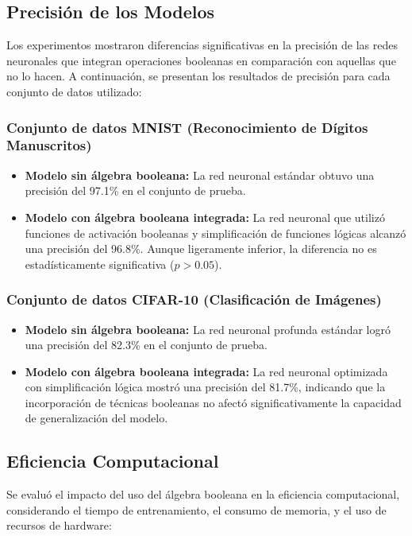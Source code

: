 \documentclass{article}
\begin{document}
\begin{multicols}{2}
\subsection{Precisión de los Modelos}
Los experimentos mostraron diferencias significativas en la precisión de las redes neuronales 
que integran operaciones booleanas en comparación con aquellas que no lo hacen. A continuación, 
se presentan los resultados de precisión para cada conjunto de datos utilizado:

\subsubsection{Conjunto de datos MNIST (Reconocimiento de Dígitos Manuscritos)}
\begin{itemize}
    \item \textbf{Modelo sin álgebra booleana:} La red neuronal estándar obtuvo una precisión 
    del 97.1\% en el conjunto de prueba.
    \item \textbf{Modelo con álgebra booleana integrada:} La red neuronal que utilizó 
    funciones de activación booleanas y simplificación de funciones lógicas alcanzó 
    una precisión del 96.8\%. Aunque ligeramente inferior, la diferencia no es 
    estadísticamente significativa ($p > 0.05$).
\end{itemize}

\subsubsection{Conjunto de datos CIFAR-10 (Clasificación de Imágenes)}
\begin{itemize}
    \item \textbf{Modelo sin álgebra booleana:} La red neuronal profunda estándar 
    logró una precisión del 82.3\% en el conjunto de prueba.
    \item \textbf{Modelo con álgebra booleana integrada:} La red neuronal optimizada 
    con simplificación lógica mostró una precisión del 81.7\%, indicando que la 
    incorporación de técnicas booleanas no afectó significativamente la capacidad de generalización 
    del modelo.
\end{itemize}

\subsection{Eficiencia Computacional}
Se evaluó el impacto del uso del álgebra booleana en la eficiencia computacional, considerando el 
tiempo de entrenamiento, el consumo de memoria, y el uso de recursos de hardware:


\end{multicols}
\end{document}
